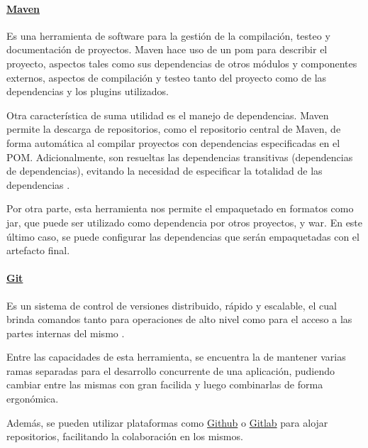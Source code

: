 \paragraph{\href{https://maven.apache.org/}{Maven}}\label{para:maven}
Es una herramienta de software para la gestión de la compilación, testeo y documentación de proyectos. Maven hace uso de un \acrfull{pom} para describir el proyecto, aspectos tales como sus dependencias de otros módulos y componentes externos, aspectos de compilación y testeo tanto del proyecto como de las dependencias y los plugins utilizados.

Otra característica de suma utilidad es el manejo de dependencias. Maven permite la descarga de repositorios, como el repositorio central de Maven, de forma automática al compilar proyectos con dependencias especificadas en el POM. Adicionalmente, son resueltas las dependencias transitivas (dependencias de dependencias), evitando la necesidad de especificar la totalidad de las dependencias \cite{sonatypeMaven}.

Por otra parte, esta herramienta nos permite el empaquetado en formatos como \acrfull{jar}, que puede ser utilizado como dependencia por otros proyectos, y \acrfull{war}. En este último caso, se puede configurar las dependencias que serán empaquetadas con el artefacto final.

\paragraph{\href{https://git-scm.com/}{Git}}
Es un sistema de control de versiones distribuido, rápido y escalable, el cual brinda comandos tanto para operaciones de alto nivel como para el acceso a las partes internas del mismo \cite{gitDocs}.

Entre las capacidades de esta herramienta, se encuentra la de mantener varias ramas separadas para el desarrollo concurrente de una aplicación, pudiendo cambiar entre las mismas con gran facilida y luego combinarlas de forma ergonómica.

Además, se pueden utilizar plataformas como \href{https://github.com/}{Github} o \href{https://gitlab.com/}{Gitlab} para alojar repositorios, facilitando la colaboración en los mismos.

